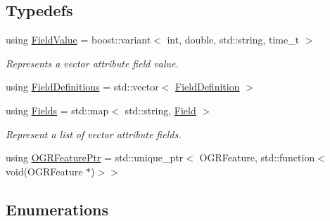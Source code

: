 \subsection*{Typedefs}
\begin{DoxyCompactItemize}
\item 
using \hyperlink{group___vector_module_ga4b8ce414fd5c655308a07474c35828c0}{Field\+Value} = boost\+::variant$<$ int, double, std\+::string, time\+\_\+t $>$
\begin{DoxyCompactList}\small\item\em Represents a vector attribute field value. \end{DoxyCompactList}\item 
using \hyperlink{namespacedg_1_1deepcore_1_1vector_a89a39c2fa657ff95f116cfed4a951386}{Field\+Definitions} = std\+::vector$<$ \hyperlink{structdg_1_1deepcore_1_1vector_1_1_field_definition}{Field\+Definition} $>$
\item 
using \hyperlink{group___vector_module_gabeca0d4b0cbea4335ae890255ca59128}{Fields} = std\+::map$<$ std\+::string, \hyperlink{structdg_1_1deepcore_1_1vector_1_1_field}{Field} $>$
\begin{DoxyCompactList}\small\item\em Represent a list of vector attribute fields. \end{DoxyCompactList}\item 
using \hyperlink{namespacedg_1_1deepcore_1_1vector_ab18ed4ff537b320bfc6ab749908f0192}{O\+G\+R\+Feature\+Ptr} = std\+::unique\+\_\+ptr$<$ O\+G\+R\+Feature, std\+::function$<$ void(O\+G\+R\+Feature $\ast$)$>$$>$
\end{DoxyCompactItemize}
\subsection*{Enumerations}
